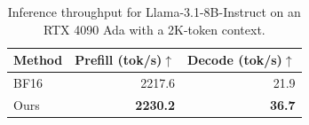 \begin{table}[t]
\centering
\caption{
Inference throughput for Llama-3.1-8B-Instruct on an RTX 4090 Ada with a 2K-token context.
}
\label{tab:throughput}
\begin{tabular}{lrr}
\toprule
Method & Prefill (tok/s)$\uparrow$ & Decode (tok/s)$\uparrow$ \\
\midrule
BF16 & 2217.6 & 21.9 \\
Ours & \textbf{2230.2} & \textbf{36.7} \\
\bottomrule
\end{tabular}
\end{table}
